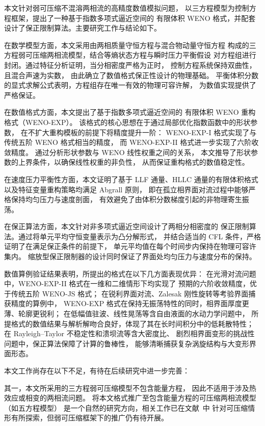 \documentclass[12pt,a4paper]{article}
\numberwithin{equation}{section}    %
\begin{document}
本文针对弱可压缩不混溶两相流的高精度数值模拟问题，
以三方程模型为控制方程框架，提出了一种基于指数多项式逼近空间的
有限体积 WENO 格式，并配套设计了保正限制算法。主要研究工作与结论如下。

在数学模型方面，本文采用由两相质量守恒方程与混合物动量守恒方程
构成的三方程弱可压缩两相流模型，结合等熵状态方程与瞬时压力平衡假设
对方程组进行封闭。通过特征分析证明，当分相密度严格为正时，
控制方程系统保持双曲性，且混合声速为实数，
由此确立了数值格式保正性设计的物理基础。
平衡体积分数的显式求解公式表明，方程组存在唯一有效的物理可容许解，
为数值实现提供了严格保证。

在数值格式方面，本文提出了基于指数多项式逼近空间的
有限体积 WENO 重构格式（WENO-EXP）。
该格式的核心思想在于通过局部优化指数函数中的形状参数，
在不扩大重构模板的前提下将精度提升一阶：
WENO-EXP-I 格式实现了与传统五阶 WENO 格式相当的精度，
而 WENO-EXP-II 格式进一步实现了六阶收敛精度。
通过分析形状参数与 WENO 线性权重之间的关系，
本文推导了形状参数的上界条件，以确保线性权重的非负性，
从而保证重构格式的数值稳定性。

在速度压力平衡性方面，本文证明了基于 LLF 通量、HLLC 通量的有限体积格式
以及特征变量重构策略均满足 Abgrall 原则，
即在孤立相界面对流过程中能够严格保持均匀压力与速度剖面，
有效避免了由体积分数梯度引起的非物理寄生振荡。

在保正算法方面，本文针对非多项式逼近空间设计了两相分相密度的
保正限制算法。通过将单元平均守恒变量表示为凸分解形式，
并结合适当的 CFL 条件，严格证明了在满足保正条件的前提下，
单元平均值在每个时间步内保持在物理可容许集内。
缩放型保正限制器的设计同时保证了界面处均匀压力与速度分布的保持。

数值算例验证结果表明，所提出的格式在以下几方面表现优异：
在光滑对流问题中，WENO-EXP-II 格式在一维和二维情形下均实现了
预期的六阶收敛精度，优于传统五阶 WENO-JS 格式；
在锐利界面对流、Zalesak 刚性旋转等考验界面捕获精度的算例中，
WENO-EXP 格式在保持无振荡特性的同时，相界面厚度更薄、轮廓更锐利；
在低幅值驻波、线性晃荡等含自由液面的水动力学问题中，
所提格式的数值结果与解析解吻合良好，体现了其在长时间积分中的低耗散特性；
在 Rayleigh--Taylor 不稳定性和溃坝流等含大密度比、
剧烈相界面变形的挑战性问题中，保正算法保障了计算的鲁棒性，
能够清晰捕获复杂涡旋结构与大变形界面形态。

本文工作尚存在以下不足，有待在后续研究中进一步完善：

其一，本文所采用的三方程弱可压缩模型不包含能量方程，
因此不适用于涉及热效应或相变的两相流问题。
将本文格式推广至包含能量方程的可压缩两相流模型（如五方程模型）
是一个自然的研究方向，相关工作已在文献~\cite{Zhang2025exponential}中
针对可压缩情形有所探索，但弱可压缩框架下的推广仍有待开展。
\end{document}

